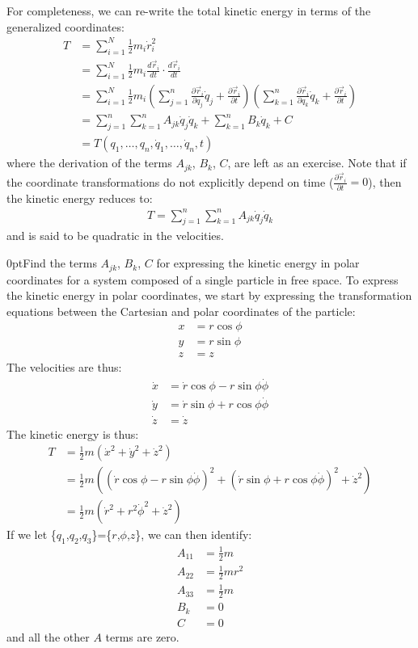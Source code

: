 For completeness, we can re-write the total kinetic energy in terms of the generalized coordinates:
\begin{align}
T&=\sum_{i=1}^N\frac{1}{2}m_i\dot{r}_i^2\nonumber\\
&=\sum_{i=1}^N\frac{1}{2}m_i\frac{d\vec{r}_i}{dt}\cdot\frac{d\vec{r}_i}{dt}\nonumber\\
&=\sum_{i=1}^N\frac{1}{2}m_i\left(\sum_{j=1}^n\frac{\partial\vec{r}_i}{\partial q_j}\dot{q}_j+\frac{\partial\vec{r}_i}{\partial t} \right) \left( \sum_{k=1}^n\frac{\partial\vec{r}_i}{\partial q_k}\dot{q}_k+\frac{\partial\vec{r}_i}{\partial t}\right)\nonumber\\
&=\sum_{j=1}^n\sum_{k=1}^n A_{jk}\dot{q}_j\dot{q}_k+\sum_{k=1}^n B_{k}\dot{q}_k +C\nonumber\\
&=T(q_1,\dots ,q_n, \dot{q}_1, \dots, \dot{q}_n,t)
\label{eqn:genT}
\end{align}
where the derivation of the terms $A_{jk}$, $B_k$, $C$, are left as an exercise. Note that if the coordinate transformations do not explicitly depend on time ($\frac{\partial\vec{r}_i}{\partial t}=0$), then the kinetic energy reduces to:
\begin{align}
T=\sum_{j=1}^n\sum_{k=1}^n A_{jk}\dot{q}_j\dot{q}_k
\end{align}
and is said to be quadratic in the velocities.
\begin{example}{0pt}{Find the terms $A_{jk}$, $B_k$, $C$ for expressing the kinetic energy in polar coordinates for a system composed of a single particle in free space.}{}
To express the kinetic energy in polar coordinates, we start by expressing the transformation equations between the Cartesian and polar coordinates of the particle:
\begin{align*}
x&=r\cos\phi\\
y&=r\sin\phi\\
z&=z
\end{align*}
The velocities are thus:
\begin{align*}
\dot x&=\dot r\cos\phi-r\sin\phi\dot\phi\\
\dot y&=\dot r\sin\phi+r\cos\phi\dot\phi\\
\dot z&=\dot z
\end{align*}
The kinetic energy is thus:
\begin{align*}
T&=\frac{1}{2}m(\dot x^2+\dot y^2+\dot z^2)\\
&=\frac{1}{2}m \left( (\dot r\cos\phi-r\sin\phi\dot\phi)^2+(\dot r\sin\phi+r\cos\phi\dot\phi)^2+\dot z^2    \right)\\
&=\frac{1}{2}m (\dot r^2+r^2\dot\phi^2+\dot z^2)
\end{align*}
If we let \{$q_1$,$q_2$,$q_3$\}=\{$r$,$\phi$,$z$\}, we can then identify:
\begin{align*}
A_{11}&=\frac{1}{2}m\\
A_{22}&=\frac{1}{2}mr^2\\
A_{33}&=\frac{1}{2}m\\
B_k&=0\\
C&=0
\end{align*}
and all the other $A$ terms are zero.

\end{example}
 
